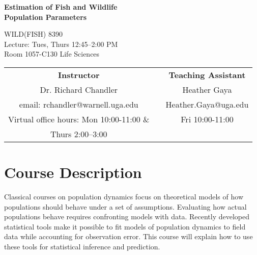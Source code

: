 \documentclass[12pt]{article}
\begin{document}

{\centering

{\Large \bf \sc
  Estimation of Fish and Wildlife \\ Population Parameters \\
}
\vspace{12pt}

WILD(FISH) 8390  \\
Lecture: Tues, Thurs 12:45--2:00 PM \\
Room 1057-C130 Life Sciences \\


\normalsize

\vspace{24pt}

\begin{tabular}[h!]{ccc}
\textbf{Instructor}                 & \hspace{0.01cm} & \textbf{Teaching Assistant} \\
Dr. Richard Chandler                & & Heather Gaya\\
email: rchandler@warnell.uga.edu    & & Heather.Gaya@uga.edu \\
Virtual office hours: Mon 10:00-11:00 \&  & & Fri 10:00-11:00 \\
   Thurs 2:00--3:00 & & \\
\end{tabular}


}



\normalsize


\vspace{-2mm}
\section*{\normalsize Course Description}
\vspace{-4mm}
Classical courses on population dynamics focus on theoretical models 
of how populations should behave under a set of assumptions.
Evaluating how actual populations behave requires confronting models
with data. Recently developed statistical tools make it possible to fit
models of population dynamics to field data while accounting for
observation error. This course will explain how to use these tools for
statistical inference and prediction.  
\end{document}
